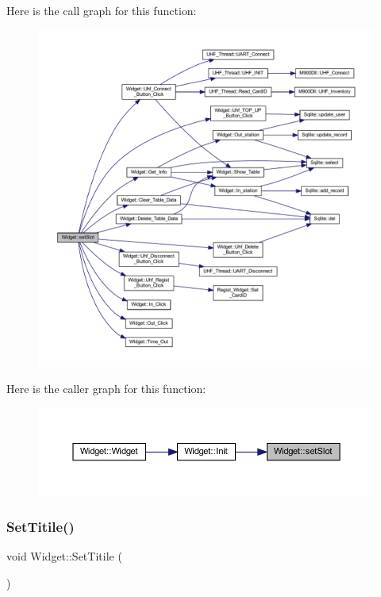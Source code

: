 Here is the call graph for this function\+:
\nopagebreak
\begin{figure}[H]
\begin{center}
\leavevmode
\includegraphics[width=350pt]{class_widget_ac60c5a62bc3197fbc7ade8f40df70c70_cgraph}
\end{center}
\end{figure}
Here is the caller graph for this function\+:
\nopagebreak
\begin{figure}[H]
\begin{center}
\leavevmode
\includegraphics[width=350pt]{class_widget_ac60c5a62bc3197fbc7ade8f40df70c70_icgraph}
\end{center}
\end{figure}
\mbox{\label{class_widget_a8499caa320e65f51b4ccf7d77ff82176}} 
\subsubsection{\texorpdfstring{SetTitile()}{SetTitile()}}
{\footnotesize\ttfamily void Widget\+::\+Set\+Titile (\begin{DoxyParamCaption}{ }\end{DoxyParamCaption})}

